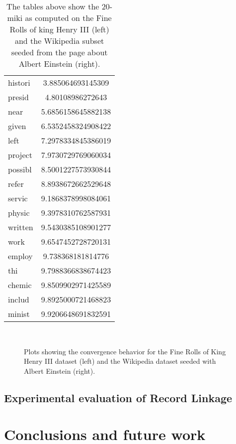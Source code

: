 \documentclass[paper=a4, fontsize=11pt]{scrartcl}
\begin{document}
\begin{table}
\begin{minipage}{.5\textwidth}
\begin{tabular}{l S[round-precision=4]}
    		histori & 3.885064693145309\\
    		presid & 4.80108986272643\\
    		near & 5.6856158645882138\\
    		given & 6.5352458324908422\\
    		left & 7.2978334845386019\\
    		project & 7.9730729769060034\\
    		possibl & 8.5001227573930844\\
    		refer & 8.8938672662529648\\
    		servic & 9.1868378998084061\\
    		physic & 9.3978310762587931\\
    		written & 9.5430385108901277\\
    		work & 9.6547452728720131\\
    		employ & 9.738368181814776\\
    		thi & 9.7988366838674423\\
    		chemic & 9.8509902971425589\\
    		includ & 9.8925000721468823\\
    		minist & 9.9206648691832591\\
    		\bottomrule
    	\end{tabular}
    	\label{t:miki_wikipedia}
    \end{minipage}
    \caption{The tables above show the 20-miki as computed on the Fine Rolls of king Henry III (left) and the Wikipedia subset seeded from the page about Albert Einstein (right).}
\end{table}

\begin{figure}
    ~
    
    \caption{Plots showing the convergence behavior for the Fine Rolls of King Henry III dataset (left) and the Wikipedia dataset seeded with Albert Einstein (right).}\label{fig:1}
\end{figure}

\subsection{Experimental evaluation of Record Linkage}




\section{Conclusions and future work}
\end{document}
